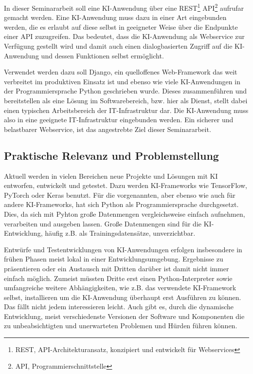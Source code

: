 \documentclass[12pt,oneside,titlepage,listof=totoc,bibliography=totoc]{scrartcl}
\begin{document}
In dieser Seminararbeit soll eine \ac{KI}-Anwendung über eine \acs{REST}\footnote{\acl{REST}, API-Architekturansatz, konzipiert und entwickelt für Webservices} \acs{API}\footnote{\acl{API}, Programmierschnittstelle} aufrufar gemacht werden. Eine \ac{KI}-Anwendung muss dazu in einer Art eingebunden werden, die es erlaubt auf diese selbst in geeigneter Weise über die Endpunkte einer API zuzugreifen. Das bedeutet, dass die \ac{KI}-Anwendung als Webservice zur Verfügung gestellt wird und damit auch einen dialogbasierten Zugriff auf die \ac{KI}-Anwendung und dessen Funktionen selbst ermöglicht. 

Verwendet werden dazu soll Django, ein quelloffenes Web-Framework das weit verbreitet im produktiven Einsatz ist und ebenso wie viele \ac{KI}-Anwendungen in der Programmiersprache Python geschrieben wurde. Dieses zusammenführen und bereitstellen als eine Lösung im Softwarebereich, bzw. hier als Dienst, stellt dabei einen typischen Arbeitsbereich der IT-Infrastruktur dar. Die \ac{KI}-Anwendung muss also in eine geeignete IT-Infrastruktur eingebunden werden. Ein sicherer und belastbarer Webservice, ist das angestrebte Ziel dieser Seminararbeit. 



\subsection{Praktische Relevanz und Problemstellung}

Aktuell werden in vielen Bereichen neue Projekte und Lösungen mit \ac{KI} entworfen, entwickelt und getestet. Dazu werden \ac{KI}-Frameworks wie TensorFlow, PyTorch oder Keras benutzt. Für die vorgenannten, aber ebenso wie auch für andere \ac{KI}-Frameworks, hat sich Python als Programmiersprache durchgesetzt. Dies, da sich mit Pyhton große Datenmengen vergleichsweise einfach aufnehmen, verarbeiten und ausgeben lassen. Große Datenmengen sind für die \ac{KI}-Entwicklung, häufig z.B. als Trainingsdatensätze, unverzichtbar. 

Entwürfe und Testentwicklungen von \ac{KI}-Anwendungen erfolgen insbesondere in frühen Phasen meist lokal in einer Entwicklungsumgebung. Ergebnisse zu präsentieren oder ein Austausch mit Dritten darüber ist damit nicht immer einfach möglich. Zumeist müssten Dritte erst einen Python-Interpreter sowie umfangreiche weitere Abhängigkeiten, wie z.B. das verwendete \ac{KI}-Framework selbst, installieren um die \ac{KI}-Anwendung überhaupt erst Ausführen zu können. Das fällt nicht jedem interessieren leicht. Auch gibt es, durch die dynamische Entwicklung, meist verschiedenste Versionen der Software und Komponenten die zu unbeabsichtigten und unerwarteten Problemen und Hürden führen können.
\end{document}
